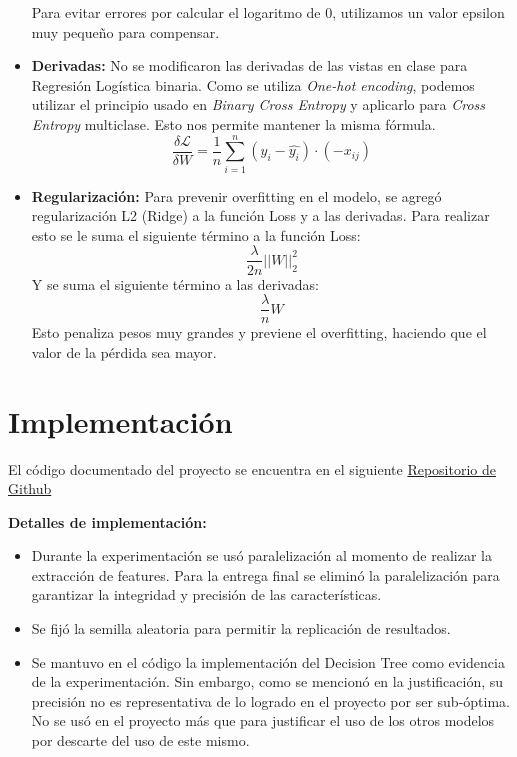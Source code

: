 \documentclass[conference]{IEEEtran}
\begin{document}
\begin{itemize}
Para evitar errores por calcular el logaritmo de $0$, utilizamos un valor epsilon muy pequeño para compensar.

\item \textbf{Derivadas:}
No se modificaron las derivadas de las vistas en clase para Regresión Logística binaria. Como se utiliza \textit{One-hot encoding}, podemos utilizar el principio usado en \textit{Binary Cross Entropy} y aplicarlo para \textit{Cross Entropy} multiclase. Esto nos permite mantener la misma fórmula.
\[\frac{\delta\mathcal{L}}{\delta W} = \frac{1}{n}\sum_{i=1}^n (y_i - \hat{y_i})\cdot (-x_{ij})\]

\item \textbf{Regularización:}
Para prevenir overfitting en el modelo, se agregó regularización L2 (Ridge) a la función Loss y a las derivadas. Para realizar esto se le suma el siguiente término a la función Loss:
\[\frac{\lambda}{2n} ||W||_2^2\]
Y se suma el siguiente término a las derivadas:
\[\frac{\lambda}{n} W\]
Esto penaliza pesos muy grandes y previene el overfitting, haciendo que el valor de la pérdida sea mayor.

\end{itemize}


\section{Implementación}
El código documentado del proyecto se encuentra en el siguiente 
\href{https://github.com/kaloslazo/SupervisedClassification}{Repositorio de Github}


\noindent \textbf{Detalles de implementación:}
\begin{itemize}
\item Durante la experimentación se usó paralelización al momento de realizar la extracción de features. Para la entrega final se eliminó la paralelización para garantizar la integridad y precisión de las características.

\item Se fijó la semilla aleatoria para permitir la replicación de resultados.

\item Se mantuvo en el código la implementación del Decision Tree como evidencia de la experimentación. Sin embargo, como se mencionó en la justificación, su precisión no es representativa de lo logrado en el proyecto por ser sub-óptima. No se usó en el proyecto más que para justificar el uso de los otros modelos por descarte del uso de este mismo.
\end{itemize}
\end{document}
